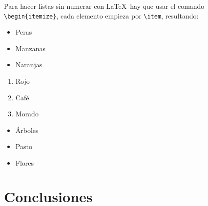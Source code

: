 	Para hacer listas sin numerar con \LaTeX\ hay que usar el comando \texttt{\textbackslash begin\{itemize\}}, cada elemento empieza por \texttt{\textbackslash item}, resultando:

	\begin{multicols}{3}
		\begin{itemize}[label={--}]
			\item Peras
			\item Manzanas
			\item Naranjas
		\end{itemize}

		\begin{enumerate}[label={*}]
			\item Rojo
			\item Café
			\item Morado
		\end{enumerate}

		\begin{itemize}
			\item Árboles
			\item Pasto
			\item Flores
		\end{itemize}
	\end{multicols}


\chapter{Conclusiones}

\lipsum[1] \\

\lipsum[2]





